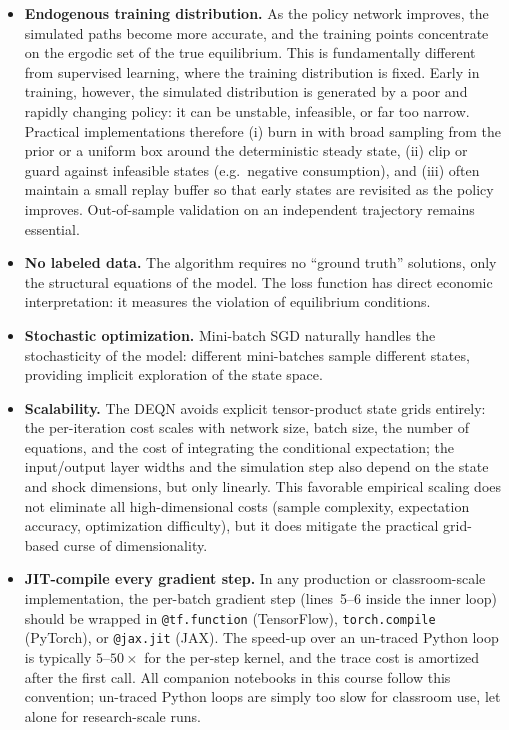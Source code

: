 \documentclass[11pt,a4paper]{report}
\begin{document}
\begin{itemize}[itemsep=2pt]
\item \textbf{Endogenous training distribution.}  As the policy network improves, the simulated paths become more accurate, and the training points concentrate on the ergodic set of the true equilibrium.  This is fundamentally different from supervised learning, where the training distribution is fixed.  Early in training, however, the simulated distribution is generated by a poor and rapidly changing policy: it can be unstable, infeasible, or far too narrow.  Practical implementations therefore (i) burn in with broad sampling from the prior or a uniform box around the deterministic steady state, (ii) clip or guard against infeasible states (e.g.\ negative consumption), and (iii) often maintain a small replay buffer so that early states are revisited as the policy improves.  Out-of-sample validation on an independent trajectory remains essential.
\item \textbf{No labeled data.}  The algorithm requires no ``ground truth'' solutions, only the structural equations of the model.  The loss function has direct economic interpretation: it measures the violation of equilibrium conditions.
\item \textbf{Stochastic optimization.}  Mini-batch SGD naturally handles the stochasticity of the model: different mini-batches sample different states, providing implicit exploration of the state space.
\item \textbf{Scalability.}  The DEQN avoids explicit tensor-product state grids entirely: the per-iteration cost scales with network size, batch size, the number of equations, and the cost of integrating the conditional expectation; the input/output layer widths and the simulation step also depend on the state and shock dimensions, but only linearly.  This favorable empirical scaling does not eliminate all high-dimensional costs (sample complexity, expectation accuracy, optimization difficulty), but it does mitigate the practical grid-based curse of dimensionality.
\item \textbf{JIT-compile every gradient step.}  In any production or classroom-scale implementation, the per-batch gradient step (lines~5--6 inside the inner loop) should be wrapped in \texttt{@tf.function} (TensorFlow), \texttt{torch.compile} (PyTorch), or \texttt{@jax.jit} (JAX).  The speed-up over an un-traced Python loop is typically $5$--$50\times$ for the per-step kernel, and the trace cost is amortized after the first call.  All companion notebooks in this course follow this convention; un-traced Python loops are simply too slow for classroom use, let alone for research-scale runs.
\end{itemize}
\end{document}
